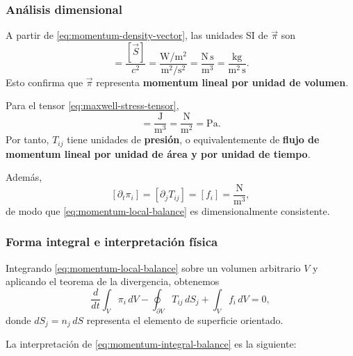 \documentclass[12pt,a4paper]{article}
\theoremstyle{definition}
\theoremstyle{plain}
\numberwithin{equation}{section}
\theoremstyle{remark}
\begin{document}
\subsubsection*{Análisis dimensional}

A partir de \eqref{eq:momentum-density-vector}, las unidades SI de $\vec\pi$ son
\begin{equation}
    [\vec\pi]
    =
    \frac{[\vec S]}{c^2}
    =
    \frac{\mathrm{W}/\mathrm{m}^2}{\mathrm{m}^2/\mathrm{s}^2}
    =
    \frac{\mathrm{N\,s}}{\mathrm{m}^3}
    =
    \frac{\mathrm{kg}}{\mathrm{m}^2\,\mathrm{s}}.
    \label{eq:units-pi}
\end{equation}
Esto confirma que $\vec\pi$ representa \textbf{momentum lineal por unidad de volumen}.

Para el tensor \eqref{eq:maxwell-stress-tensor},
\begin{equation}
    [T_{ij}]
    =
    \frac{\mathrm{J}}{\mathrm{m}^3}
    =
    \frac{\mathrm{N}}{\mathrm{m}^2}
    =
    \mathrm{Pa}.
    \label{eq:units-T}
\end{equation}
Por tanto, $T_{ij}$ tiene unidades de \textbf{presión}, o equivalentemente de \textbf{flujo de momentum lineal por unidad de área y por unidad de tiempo}.

Además,
\begin{equation}
    \left[\partial_t\pi_i\right]
    =
    \left[\partial_jT_{ij}\right]
    =
    [f_i]
    =
    \frac{\mathrm{N}}{\mathrm{m}^3},
    \label{eq:units-local-momentum-balance}
\end{equation}
de modo que \eqref{eq:momentum-local-balance} es dimensionalmente consistente.

\subsubsection*{Forma integral e interpretación física}

Integrando \eqref{eq:momentum-local-balance} sobre un volumen arbitrario $V$ y aplicando el teorema de la divergencia, obtenemos
\begin{equation}
    \frac{d}{dt}\int_V \pi_i\,dV
    -
    \oint_{\partial V}T_{ij}\,dS_j
    +
    \int_V f_i\,dV
    =0,
    \label{eq:momentum-integral-balance}
\end{equation}
donde $dS_j=n_j\,dS$ representa el elemento de superficie orientado.

La interpretación de \eqref{eq:momentum-integral-balance} es la siguiente:
\end{document}
